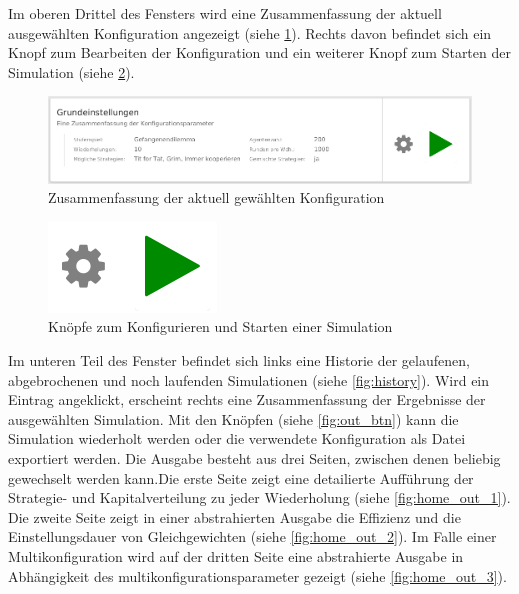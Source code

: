 \documentclass[parskip=full,11pt]{scrartcl}
\begin{document}
Im oberen Drittel des Fensters wird eine Zusammenfassung der aktuell ausgewählten Konfiguration angezeigt (siehe \cref{fig:home_top}). Rechts davon befindet sich ein Knopf zum Bearbeiten der Konfiguration und ein weiterer Knopf zum Starten der Simulation (siehe \cref{fig:main_btn}).

\begin{figure}[hb]
	\centering
	\includegraphics[width=\textwidth]{images/home_top.png}
	\caption{\label{fig:home_top}
	Zusammenfassung der aktuell gewählten Konfiguration}
\end{figure}

\begin{figure}[ht]
	\centering
 	\includegraphics[width=0.25\linewidth]{images/main_btn.png}
 	\caption{\label{fig:main_btn}
 		Knöpfe zum Konfigurieren und Starten einer Simulation}
\end{figure}


\newpage
Im unteren Teil des Fenster befindet sich links eine Historie der gelaufenen, abgebrochenen und noch laufenden Simulationen (siehe \cref{fig:history}). Wird ein Eintrag angeklickt, erscheint rechts eine Zusammenfassung der Ergebnisse der ausgewählten Simulation. Mit den Knöpfen (siehe \cref{fig:out_btn}) kann die Simulation wiederholt werden oder die verwendete Konfiguration als Datei exportiert werden. Die Ausgabe besteht aus drei Seiten, zwischen denen beliebig gewechselt werden kann.Die erste Seite zeigt eine detailierte Aufführung der Strategie- und Kapitalverteilung zu jeder Wiederholung (siehe \cref{fig:home_out_1}). Die zweite Seite zeigt in einer abstrahierten Ausgabe die \Gls{Effizienz} und die \Gls{Einstellungsdauer} von Gleichgewichten (siehe \cref{fig:home_out_2}). Im Falle einer Multikonfiguration wird auf der dritten Seite eine abstrahierte Ausgabe in Abhängigkeit des multikonfigurationsparameter gezeigt (siehe \cref{fig:home_out_3}).
\end{document}

